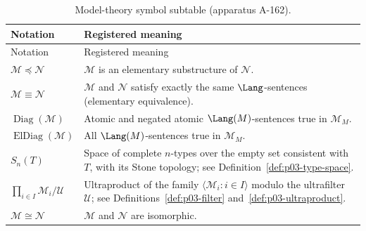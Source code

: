 \begingroup\small
\begin{longtable}{@{}p{}p{}@{}}
\caption{Model-theory symbol subtable (apparatus A-162).}
\label{tab:p03-model-symbols}\\
\toprule
Notation & Registered meaning \\
\midrule
\endfirsthead
\toprule
Notation & Registered meaning \\
\midrule
\endhead
\(\mathcal M\preccurlyeq\mathcal N\) &
  \(\mathcal M\) is an elementary substructure of \(\mathcal N\). \\
\addlinespace
\(\mathcal M\equiv\mathcal N\) &
  \(\mathcal M\) and \(\mathcal N\) satisfy exactly the same
  \(\Lang\)-sentences (elementary equivalence). \\
\addlinespace
\(\operatorname{Diag}(\mathcal M)\) &
  Atomic and negated atomic \(\Lang(M)\)-sentences true in \(\mathcal M_M\). \\
\addlinespace
\(\operatorname{ElDiag}(\mathcal M)\) &
  All \(\Lang(M)\)-sentences true in \(\mathcal M_M\). \\
\addlinespace
\(S_n(T)\) &
  Space of complete \(n\)-types over the empty set consistent with \(T\), with
  its Stone topology; see Definition~\ref{def:p03-type-space}. \\
\addlinespace
\(\displaystyle\prod_{i\in I}\mathcal M_i/\mathcal U\) &
  Ultraproduct of the family \(\langle\mathcal M_i:i\in I\rangle\) modulo
  the ultrafilter \(\mathcal U\); see
  Definitions~\ref{def:p03-filter} and~\ref{def:p03-ultraproduct}. \\
\addlinespace
\(\mathcal M\cong\mathcal N\) &
  \(\mathcal M\) and \(\mathcal N\) are isomorphic. \\
\bottomrule
\end{longtable}
\endgroup
